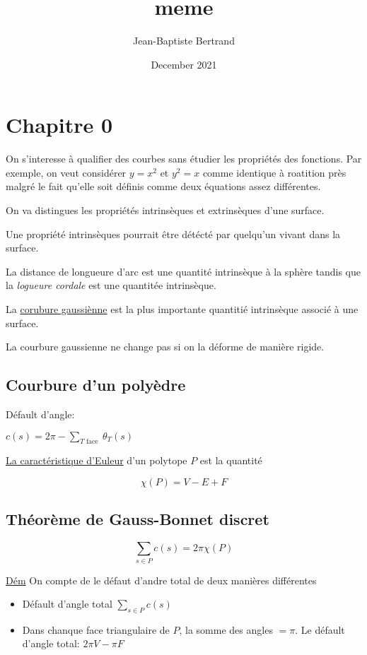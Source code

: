 \documentclass{article}
\title{meme}
\author{Jean-Baptiste Bertrand}
\date{December 2021}
\begin{document}
\section{Chapitre 0}

On s'interesse à qualifier des courbes sans étudier les propriétés des fonctions. Par exemple, on veut considérer $y=x^2$ et $y^2=x$ comme identique à roatition près malgré le fait qu'elle soit définis comme deux équations assez différentes.

On va distingues les propriétés intrinsèques et extrinsèques d'une surface.

Une propriété intrinsèques pourrait être détécté par quelqu'un vivant dans la surface.

La distance de longueure d'arc est une quantité intrinsèque à la sphère tandis que la \textit{logueure cordale} est une quantitée intrinsèque.

La \underline{corubure gaussiènne} est la plus importante quantitié intrinsèque associé à une surface.

La courbure gaussienne ne change pas si on la déforme de manière rigide.

\subsection{Courbure d'un polyèdre}

Défault d'angle:

$c(s)=2 \pi-\sum_{T \text { face }} \theta_{T}(s)$


\underline{La caractéristique d'Euleur} d'un polytope $P$ est la quantité

$$\chi(P) = V - E + F$$


\subsection{Théorème de Gauss-Bonnet discret}

$$\sum_{s \in P} c(s) = 2\pi \chi(P)$$


\underline{Dém} On compte de le défaut d'andre total de deux manières différentes

\begin{itemize}
	\item Défault d'angle total $\sum_{s \in P} c(s)$
	\item Dans chanque face triangulaire de $P$, la somme des angles $=\pi$. Le défault d'angle total: $2\pi V-\pi F$
\end{itemize}
\end{document}
